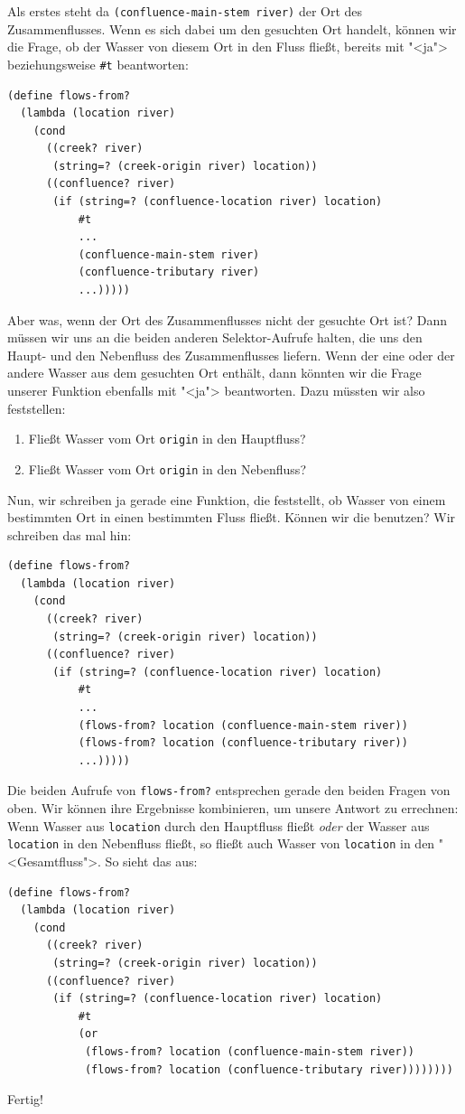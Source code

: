 Als erstes steht da \lstinline{(confluence-main-stem river)} der Ort
des Zusammenflusses.  Wenn es sich dabei um den gesuchten Ort handelt,
können wir die Frage, ob der Wasser von diesem Ort in den Fluss fließt, bereits
mit "<ja"> beziehungsweise \lstinline{#t} beantworten:
%
\begin{lstlisting}
(define flows-from?
  (lambda (location river)
    (cond
      ((creek? river)
       (string=? (creek-origin river) location))
      ((confluence? river)
       (if (string=? (confluence-location river) location)
           #t
           ...
           (confluence-main-stem river)
           (confluence-tributary river)
           ...)))))
\end{lstlisting}
%
Aber was, wenn der Ort des Zusammenflusses nicht der gesuchte Ort ist?
Dann müssen wir uns an die beiden anderen
Selektor-Aufrufe halten, die uns den Haupt- und den Nebenfluss des
Zusammenflusses liefern.  Wenn der eine oder der andere Wasser aus dem
gesuchten Ort enthält, dann könnten wir die Frage unserer Funktion
ebenfalls mit "<ja"> beantworten.  Dazu müssten wir also feststellen:
%
\begin{enumerate}
\item Fließt Wasser vom Ort \lstinline{origin} in den Hauptfluss?
\item Fließt Wasser vom Ort \lstinline{origin} in den Nebenfluss?
\end{enumerate}
%
Nun, wir schreiben ja gerade eine Funktion, die feststellt, ob Wasser
von einem bestimmten Ort in einen bestimmten Fluss fließt.  Können wir
die benutzen?  Wir schreiben das mal hin:
%
\begin{lstlisting}
(define flows-from?
  (lambda (location river)
    (cond
      ((creek? river)
       (string=? (creek-origin river) location))
      ((confluence? river)
       (if (string=? (confluence-location river) location)
           #t
           ...
           (flows-from? location (confluence-main-stem river))
           (flows-from? location (confluence-tributary river))
           ...)))))
\end{lstlisting}
%
Die beiden Aufrufe von \lstinline{flows-from?} entsprechen gerade
den beiden Fragen von oben.  Wir können ihre Ergebnisse kombinieren,
um unsere Antwort zu errechnen: Wenn Wasser aus \lstinline{location}
durch den Hauptfluss fließt \emph{oder} der Wasser aus
\lstinline{location} in den Nebenfluss fließt, so fließt auch Wasser
von \lstinline{location} in den "<Gesamtfluss">.  So sieht das aus:
%
\begin{lstlisting}
(define flows-from?
  (lambda (location river)
    (cond
      ((creek? river)
       (string=? (creek-origin river) location))
      ((confluence? river)
       (if (string=? (confluence-location river) location)
           #t
           (or
            (flows-from? location (confluence-main-stem river))
            (flows-from? location (confluence-tributary river))))))))
\end{lstlisting}
%
Fertig!

